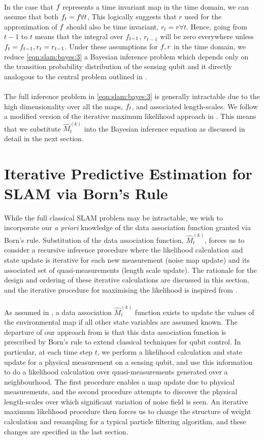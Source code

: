   \\
  In the case that $f_{ }$ represents a time invariant map in the time domain, we can assume that both $f_{ t} = f_{ } \forall t$, This logically suggests that $r$ used for the approximation of $f_{ }$ should also be time invariant, $r_t = r \forall t$. Hence, going from $t-1$ to $t$ means that the integral over $f_{ t-1}$, $r_{t-1}$ will be zero everywhere unless $f_{ t}=f_{ t-1}, r_t = r_{t-1}$. Under these assumptions for $f_{ }, r$ in the time domain, we reduce \cref{eqn:slam:bayes:3} a Bayesian inference problem which depends only on the transition probability distribution of the sensing qubit and it directly analogous to the central problem outlined in \cite{thrun2001probabilistic}.\\
  \\
  The full inference problem in \cref{eqn:slam:bayes:3} is generally intractable due to the high dimensionality over all the maps, $f_{ t}$, and associated length-scales. We follow a modified version of the iterative maximum likelihood approach in \cite{thrun2001probabilistic}. This means that we substitute $\hat{M}_t^{(k)}$ into the Bayesian inference equation as discussed in detail in the next section. 
  
\section{Iterative Predictive Estimation for SLAM via Born's Rule}
While the full classical SLAM problem may be intractable, we wish to incorporate our \textit{a priori} knowledge of the data association function granted via Born's rule. Substitution of the data association function,  $\hat{M}_t^{(k)}$, forces us to consider a recursive inference procedure where the likelihood calculation and state update is iterative for each new measurement (noise map update) and its associated set of quasi-measurements (length scale update). The rationale for the design and ordering of these iterative calculations are discussed in this section, and the iterative procedure for maximising the likelihood is inspired from \cite{thrun2001probabilistic}.\\
\\
As assumed in \cite{thrun2001probabilistic}, a data association $\hat{M}_t^{(k)}$ function exists to update the values of the environmental map if all other state variables are assumed known. The departure of our approach from \cite{thrun2001probabilistic} is that this data association function is prescribed by Born's rule to extend classical techniques for qubit control. In particular, at each time step $t$,  we perform a likelihood calculation and state update for a physical measurement on a sensing qubit, and use this information to do a likelihood calculation over quasi-measurements generated over a neighbourhood. The first procedure enables a map update due to physical measurements, and the second procedure attempts to discover the physical length-scales over which significant variation of noise field is seen.  An iterative maximum likelihood procedure then forces us to change the structure of weight calculation and resampling for a typical particle filtering algorithm, and these changes are specified in the last section.
  
